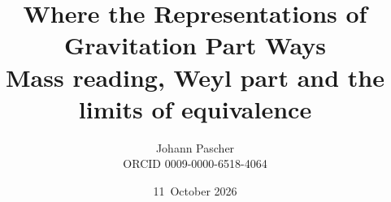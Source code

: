 \documentclass[11pt,a4paper]{report}
\title{Where the Representations of Gravitation Part Ways\\[0.5em]
  \large Mass reading, Weyl part and the limits of equivalence}
\date{11~October 2026}
\author{Johann Pascher\\\small ORCID 0009-0000-6518-4064}
\begin{document}
\renewcommand{\thechapter}{}
\renewcommand{\thesection}{\arabic{section}}
\maketitle
\tableofcontents

\end{document}
